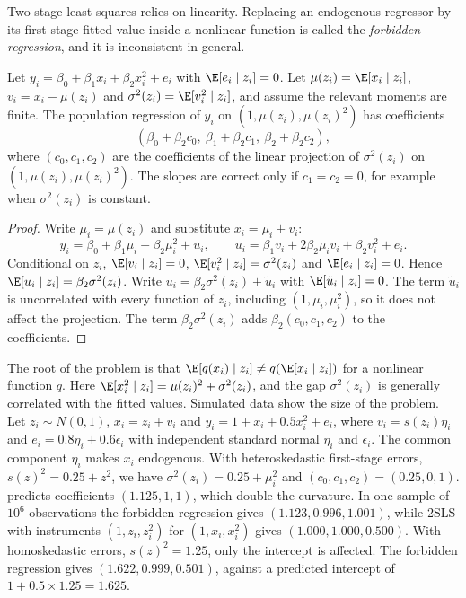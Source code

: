 Two-stage least squares relies on linearity. Replacing an endogenous regressor by its first-stage fitted
value inside a nonlinear function is called the \emph{forbidden regression}, and it is inconsistent in
general.

\begin{proposition}\label{prop:A-forbidden}
Let $y_i = \beta_0 + \beta_1x_i + \beta_2x_i^2 + e_i$ with $\E[e_i \mid z_i] = 0$. Let $\mu(z_i) = \E[x_i \mid z_i]$,
$v_i = x_i - \mu(z_i)$ and $\sigma^2(z_i) = \E[v_i^2 \mid z_i]$, and assume the relevant moments are finite. The
population regression of $y_i$ on $(1, \mu(z_i), \mu(z_i)^2)$ has coefficients
\begin{equation}\label{eq:A-forbidden}
(\beta_0 + \beta_2c_0,\ \beta_1 + \beta_2c_1,\ \beta_2 + \beta_2c_2) ,
\end{equation}
where $(c_0, c_1, c_2)$ are the coefficients of the linear projection of $\sigma^2(z_i)$ on
$(1, \mu(z_i), \mu(z_i)^2)$. The slopes are correct only if $c_1 = c_2 = 0$, for example when $\sigma^2(z_i)$ is
constant.
\end{proposition}

\begin{proof}
Write $\mu_i = \mu(z_i)$ and substitute $x_i = \mu_i + v_i$:
\begin{equation*}
y_i = \beta_0 + \beta_1\mu_i + \beta_2\mu_i^2 + u_i, \qquad u_i = \beta_1v_i + 2\beta_2\mu_iv_i + \beta_2v_i^2 + e_i .
\end{equation*}
Conditional on $z_i$, $\E[v_i \mid z_i] = 0$, $\E[v_i^2 \mid z_i] = \sigma^2(z_i)$ and $\E[e_i \mid z_i] = 0$. Hence
$\E[u_i \mid z_i] = \beta_2\sigma^2(z_i)$. Write $u_i = \beta_2\sigma^2(z_i) + \tilde u_i$ with
$\E[\tilde u_i \mid z_i] = 0$. The term $\tilde u_i$ is uncorrelated with every function of $z_i$, including
$(1, \mu_i, \mu_i^2)$, so it does not affect the projection. The term $\beta_2\sigma^2(z_i)$ adds
$\beta_2(c_0, c_1, c_2)$ to the coefficients.
\end{proof}

The root of the problem is that $\E[q(x_i) \mid z_i] \neq q(\E[x_i \mid z_i])$ for a nonlinear function $q$. Here
$\E[x_i^2 \mid z_i] = \mu(z_i)^2 + \sigma^2(z_i)$, and the gap $\sigma^2(z_i)$ is generally correlated with the
fitted values. Simulated data show the size of the problem. Let $z_i \sim N(0, 1)$, $x_i = z_i + v_i$ and
$y_i = 1 + x_i + 0.5x_i^2 + e_i$, where $v_i = s(z_i)\eta_i$ and $e_i = 0.8\eta_i + 0.6\epsilon_i$ with independent
standard normal $\eta_i$ and $\epsilon_i$. The common component $\eta_i$ makes $x_i$ endogenous. With
heteroskedastic first-stage errors, $s(z)^2 = 0.25 + z^2$, we have $\sigma^2(z_i) = 0.25 + \mu_i^2$ and
$(c_0, c_1, c_2) = (0.25, 0, 1)$.  predicts coefficients $(1.125, 1, 1)$, which double the
curvature. In one sample of $10^6$ observations the forbidden regression gives $(1.123, 0.996, 1.001)$, while
2SLS with instruments $(1, z_i, z_i^2)$ for $(1, x_i, x_i^2)$ gives $(1.000, 1.000, 0.500)$. With homoskedastic
errors, $s(z)^2 = 1.25$, only the intercept is affected. The forbidden regression gives $(1.622, 0.999, 0.501)$,
against a predicted intercept of $1 + 0.5 \times 1.25 = 1.625$.


